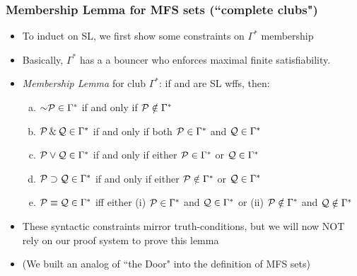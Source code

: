 \begin{frame}
\frametitle{Membership Lemma for MFS sets (``complete clubs")}

\begin{itemize}[<+->]

\item To induct on SL, we first show some constraints on $\Gamma^{\ast}$ membership

\item Basically, $\Gamma^{\ast}$ has a a bouncer who enforces maximal finite satisfiability. 

\item \emph{Membership Lemma} for club $\Gamma^{\ast}$: if  and  are SL wffs, then:

\begin{enumerate}[a.)]

\item $\enot \metav{P} \in \Gamma^{\ast}$ if and only if $\mathcal{P} \notin \Gamma^{\ast}$

\item $\mathcal{P} \,\&\, \mathcal{Q} \in \Gamma^{\ast}$ if and only if both $\mathcal{P}\in \Gamma^{\ast}$ and $\mathcal{Q}\in \Gamma^{\ast}$

\item $\mathcal{P} \vee \mathcal{Q} \in \Gamma^{\ast}$ if and only if either $\mathcal{P}\in \Gamma^{\ast}$ or $\mathcal{Q}\in \Gamma^{\ast}$

\item $\mathcal{P} \supset \mathcal{Q} \in \Gamma^{\ast}$ if and only if either $\mathcal{P}\notin \Gamma^{\ast}$ or $\mathcal{Q}\in \Gamma^{\ast}$

\item $\mathcal{P} \equiv \mathcal{Q} \in \Gamma^{\ast}$ iff either (i) $\mathcal{P}\in \Gamma^{\ast}$ and $\mathcal{Q}\in \Gamma^{\ast}$ or (ii) $\mathcal{P}\notin \Gamma^{\ast}$ and $\mathcal{Q}\notin \Gamma^{\ast}$

\end{enumerate}

\item These syntactic constraints mirror truth-conditions, but we will now NOT rely on our proof system to prove this lemma 

\item (We built an analog of ``the Door" into the definition of MFS sets)

\end{itemize}
\end{frame}

